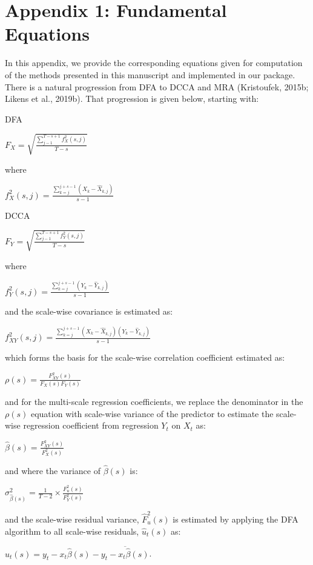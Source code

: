 \documentclass[
  man]{apa6}
\begin{document}
\hypertarget{appendix-1-fundamental-equations}{%
\section{Appendix 1: Fundamental Equations}\label{appendix-1-fundamental-equations}}

In this appendix, we provide the corresponding equations given for
computation of the methods presented in this manuscript and implemented
in our package. There is a natural progression from DFA to DCCA and MRA
(Kristoufek, 2015b; Likens et al., 2019b). That progression is given below,
starting with:

DFA

\(F_X = \sqrt{\frac{\sum^{T-s+1}_{j-1}f^2_X(s,j)}{T-s}}\)

where

\(f^2_X(s,j) = \frac{\sum^{j+s-1}_{k=j}(X_k -\widehat{X}_{k,j})}{s-1}\)

DCCA

\(F_Y = \sqrt{\frac{\sum^{T-s+1}_{j-1}f^2_Y(s,j)}{T-s}}\)

where

\(f^2_Y(s,j) = \frac{\sum^{j+s-1}_{k=j}(Y_k -\widehat{Y}_{k,j})}{s-1}\)

and the scale-wise covariance is estimated as:

\(f^2_{XY}(s,j) = \frac{\sum^{j+s-1}_{k=j}(X_k -\widehat{X}_{k,j})(Y_k -\widehat{Y}_{k,j})}{s-1}\)

which forms the basis for the scale-wise correlation coefficient
estimated as:

\(\rho(s) = \frac{F^2_{XY}(s)}{F_X(s)F_Y(s)}\)

and for the multi-scale regression coefficients, we replace the
denominator in the \(\rho(s)\) equation with scale-wise variance of the
predictor to estimate the scale-wise regression coefficient from
regression \(Y_t\) on \(X_t\) as:

\(\widehat{\beta}(s) = \frac{F^2_{XY}(s)}{F^2_X(s)}\)

and where the variance of \(\widehat{\beta}(s)\) is:

\(\sigma_{\widehat{\beta}(s)}^2 = \frac{1}{T-2} \times \frac{F^2_u(s)}{F^2_Y(s)}\)

and the scale-wise residual variance, \(\widehat{F}^2_u(s)\) is estimated
by applying the DFA algorithm to all scale-wise residuals,
\(\widehat{u}_t(s)\) as:

\(\widehat{u}_t(s) = y_t - x_t\widehat{\beta}(s) - \overline{y_t - x_t\widehat{\beta}(s)}\).
\end{document}
